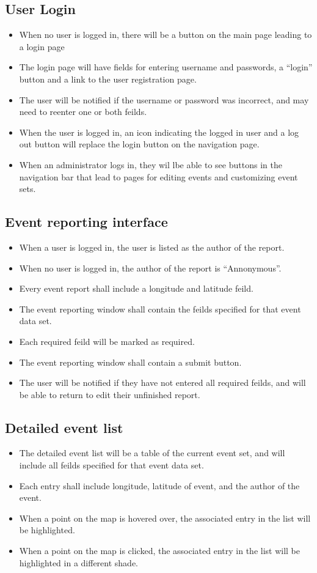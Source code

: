 \subsection{User Login}
\begin{itemize}
\item When no user is logged in, there will be a button on the main page leading to a login page
\item The login page will have fields for entering username and passwords, a ``login'' button and a link to the user registration page.
\item The user will be notified if the username or password was incorrect, and may need to reenter one or both feilds.
\item When the user is logged in, an icon indicating the logged in user and a log out button will replace the login button on the navigation page.
\item When an administrator logs in, they wil lbe able to see buttons in the navigation bar that lead to pages for editing events and customizing event sets.
\end{itemize}

\subsection{Event reporting interface}
\begin{itemize}
\item When a user is logged in, the user is listed as the author of the report.
\item When no user is logged in, the author of the report is ``Annonymous''.
\item Every event report shall include a longitude and latitude feild.
\item The event reporting window shall contain the feilds specified for that event data set.
\item Each required feild will be marked as required.
\item The event reporting window shall contain a submit button.
\item The user will be notified if they have not entered all required feilds, and will be able to return to edit their unfinished report.
\end{itemize}

\subsection{Detailed event list}
\begin{itemize}
\item The detailed event list will be a table of the current event set, and will include all feilds specified for that event data set.
\item Each entry shall include longitude, latitude of event, and the author of the event.
\item When a point on the map is hovered over, the associated entry in the list will be highlighted.
\item When a point on the map is clicked, the associated entry in the list will be highlighted in a different shade.
\end{itemize}

